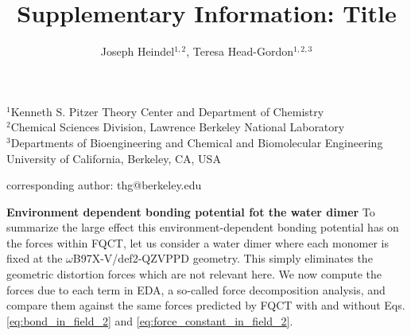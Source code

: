 \documentclass[12pt,letter]{article}
\begin{document}
\title{Supplementary Information: Title}
\author{Joseph Heindel$^{1,2}$, Teresa Head-Gordon$^{1,2,3}$}
\date{\vspace{-10ex}}
\maketitle
\noindent
\begin{center}
$^1$Kenneth S. Pitzer Theory Center and Department of Chemistry\\
$^2$Chemical Sciences Division, Lawrence Berkeley National Laboratory\\
$^3$Departments of Bioengineering and Chemical and Biomolecular Engineering\\
University of California, Berkeley, CA, USA


corresponding author: thg@berkeley.edu
\end{center}

\newpage
\textbf{Environment dependent bonding potential fot the water dimer}
To summarize the large effect this environment-dependent bonding potential has on the forces within FQCT, let us consider a water dimer where each monomer is fixed at the $\omega$B97X-V/def2-QZVPPD geometry. This simply eliminates the geometric distortion forces which are not relevant here. We now compute the forces due to each term in EDA, a so-called force decomposition analysis\cite{aldossary2023force}, and compare them against the same forces predicted by FQCT with and without Eqs. \ref{eq:bond_in_field_2} and \ref{eq:force_constant_in_field_2}.
\end{document}
